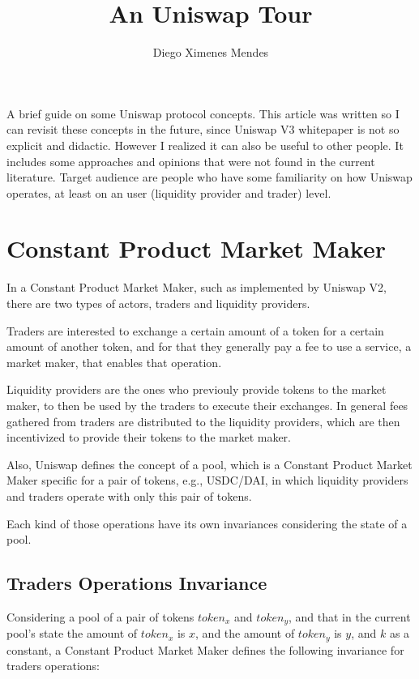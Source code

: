 \documentclass{article}
\title{An Uniswap Tour}
\author{Diego Ximenes Mendes}
\begin{document}
\date{}
\maketitle

A brief guide on some Uniswap protocol concepts.
This article was written so I can revisit these concepts in the future, since Uniswap V3 whitepaper is not so explicit and didactic.
However I realized it can also be useful to other people.
It includes some approaches and opinions that were not found in the current literature.
Target audience are people who have some familiarity on how Uniswap operates, at least on an user (liquidity provider and trader) level.

\section{Constant Product Market Maker}

In a Constant Product Market Maker, such as implemented by Uniswap V2, there are two types of actors, traders and liquidity providers.

Traders are interested to exchange a certain amount of a token for a certain amount of another token, and for that they generally pay a fee to use a service, a market maker, that enables that operation.

Liquidity providers are the ones who previouly provide tokens to the market maker, to then be used by the traders to execute their exchanges.
In general fees gathered from traders are distributed to the liquidity providers, which are then incentivized to provide their tokens to the market maker.

Also, Uniswap defines the concept of a pool, which is a Constant Product Market Maker specific for a pair of tokens, e.g., USDC/DAI, in which liquidity providers and traders operate with only this pair of tokens.

Each kind of those operations have its own invariances considering the state of a pool.

\subsection{Traders Operations Invariance}
\label{section:traders_invariance}

Considering a pool of a pair of tokens $token_x$ and $token_y$, and that in the current pool's state the amount of $token_x$ is $x$, and the amount of $token_y$ is $y$, and $k$ as a constant, a Constant Product Market Maker defines the following invariance for traders operations:
\end{document}
